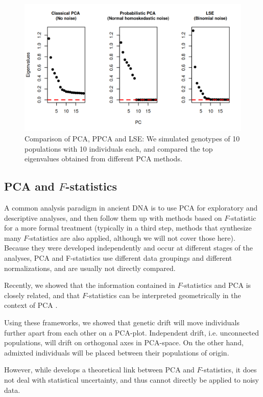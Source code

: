 \documentclass[12pt, letterpaper]{article}
\begin{document}
\begin{figure}[ht!]
    \includegraphics[width=16.5cm]{plots/pca_all_genetic.png}
    \centering
    \caption{Comparison of PCA, PPCA and LSE: We simulated genotypes of 10 populations with 10 individuals each, and compared the top eigenvalues obtained from different PCA methods.}
    \label{fig1:pca_ppca} 
\end{figure}

\subsection{PCA and $F$-statistics}
A common analysis paradigm in ancient DNA is to use PCA for exploratory and descriptive analyses, and then follow them up with methods based on $F$-statistic for a more formal treatment (typically in a third step, methods that synthesize many $F$-statistics are also applied, although we will not cover those here). Because they were developed independently and occur at different stages of the analyses, PCA and F-statistics use different data groupings and different normalizations, and are usually not directly compared. 

Recently, we showed that the information contained in $F$-statistics and PCA is closely related, and that $F$-statistics can be interpreted geometrically in the context of PCA \cite{peter_geometric_2022, oteo-garcia_geometrical_2021}.

Using these frameworks, we showed that genetic drift will move individuals further apart from each other on a PCA-plot. Independent drift, i.e. unconnected populations, will drift on orthogonal axes in PCA-space. On the other hand, admixted individuals will be placed between their populations of origin.  


However, while \cite{peter_geometric_2022} develops a theoretical link between PCA and $F$-statistics, it does not deal with statistical uncertainty, and thus cannot directly be applied to noisy data. 
\end{document}
